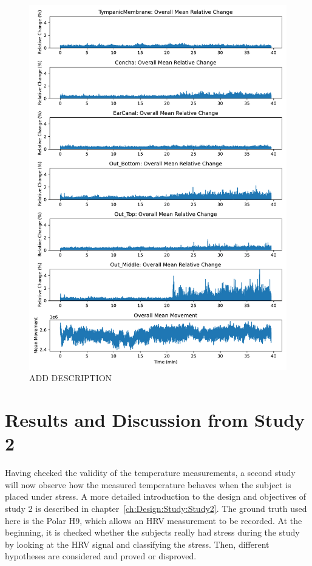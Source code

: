 \begin{figure}
    \centering
    \includegraphics[width=\textwidth]{thesis-doc/images/study1/hypothesis5/overall_mean_data_hypothesis5.pdf}
    \caption{ADD DESCRIPTION}    
    \label{fig:eval:study1:hypothesis5_result}
\end{figure}


\section{Results and Discussion from Study 2}
\label{sec:Evaluation:Study2}
Having checked the validity of the temperature measurements, a second study will now observe how the measured temperature behaves when the subject is placed under stress.
A more detailed introduction to the design and objectives of study 2 is described in chapter~\ref{ch:Design:Study:Study2}.
The ground truth used here is the Polar H9, which allows an HRV measurement to be recorded.
At the beginning, it is checked whether the subjects really had stress during the study by looking at the HRV signal and classifying the stress.
Then, different hypotheses are considered and proved or disproved.

